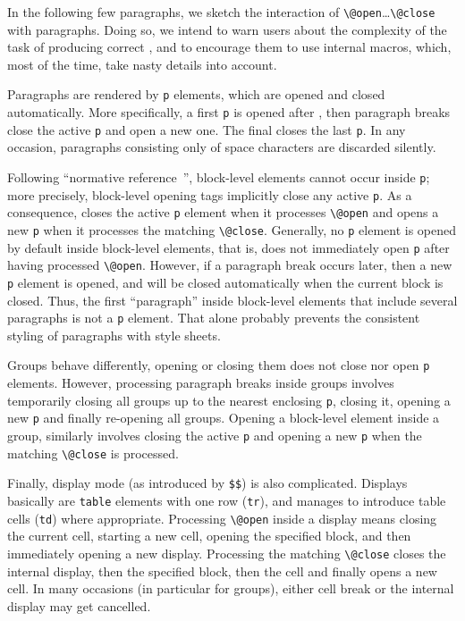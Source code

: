 In the following few paragraphs, we sketch the interaction of
\verb+\@open+\ldots\verb+\@close+ with paragraphs.
Doing so, we intend to warn users about the complexity
of the task of producing correct \html{}, and to encourage
them to use internal macros, which, most of the time, take nasty
details into account.

Paragraphs are rendered by \verb+p+ elements, which are opened and
closed automatically.
More specifically, a first \verb+p+ is opened after
\verb++, then paragraph breaks close the active
\verb+p+ and open a new one.
The final \verb++ closes the last \verb+p+.
In any occasion, paragraphs consisting only of space characters
are discarded silently.

Following \html{} ``normative reference~\cite{html}'', block-level
elements cannot occur inside \verb+p+; more precisely,
block-level opening tags implicitly close any active \verb+p+.
As a consequence,
\hevea{} closes the active \verb+p+ element when it processes
\verb+\@open+
and opens a new \verb+p+ when it processes the matching
\verb+\@close+.
Generally, no \verb+p+ element is opened by default inside block-level
elements, that is, \hevea{} does not immediately open \verb+p+ after having
processed \verb+\@open+.
However, if a paragraph break occurs later, then a new \verb+p+
element is opened, and will be closed automatically
when the current block is closed.
Thus, the first ``paragraph'' inside block-level elements
that include several paragraphs is not a \verb+p+ element.
That alone probably prevents the consistent styling
of paragraphs with style sheets.

Groups behave differently, opening or closing them does
not close nor open \verb+p+ elements.
However, processing paragraph breaks inside groups involves temporarily
closing all groups up to the nearest enclosing \verb+p+, closing it,
opening a new \verb+p+ and finally re-opening all groups.
Opening a block-level element inside a group, similarly
involves closing the active \verb+p+ and opening a new \verb+p+
when the matching \verb+\@close+ is processed.

Finally, display mode (as introduced by \verb+$$+) is also
complicated. Displays basically are \verb+table+ elements with one row
(\verb+tr+), and \hevea{} manages to introduce table cells (\verb+td+)
where appropriate.  Processing \verb+\@open+ inside a display
means closing the current cell, starting a new cell, opening the
specified block, and then immediately opening a new display.
Processing the matching \verb+\@close+ closes the internal
display, then the specified block, then the cell and finally opens a
new cell. In many occasions (in particular for groups), either cell
break or the internal display may get cancelled.


